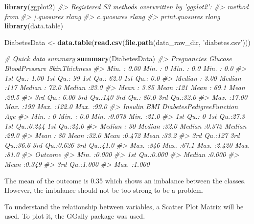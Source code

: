 \documentclass[]{book}
\newenvironment{Shaded}{\begin{snugshade}}{\end{snugshade}}
\newcommand{\CommentTok}[1]{\textcolor[rgb]{0.56,0.35,0.01}{\textit{#1}}}
\newcommand{\KeywordTok}[1]{\textcolor[rgb]{0.13,0.29,0.53}{\textbf{#1}}}
\newcommand{\NormalTok}[1]{#1}
\newcommand{\StringTok}[1]{\textcolor[rgb]{0.31,0.60,0.02}{#1}}
\begin{document}
\begin{Shaded}
\begin{Highlighting}[]
\KeywordTok{library}\NormalTok{(ggplot2)}
\CommentTok{#> Registered S3 methods overwritten by 'ggplot2':}
\CommentTok{#>   method         from }
\CommentTok{#>   [.quosures     rlang}
\CommentTok{#>   c.quosures     rlang}
\CommentTok{#>   print.quosures rlang}
\KeywordTok{library}\NormalTok{(data.table)}

\NormalTok{DiabetesData <-}\StringTok{ }\KeywordTok{data.table}\NormalTok{(}\KeywordTok{read.csv}\NormalTok{(}\KeywordTok{file.path}\NormalTok{(data_raw_dir, }\StringTok{'diabetes.csv'}\NormalTok{)))}

\CommentTok{# Quick data summary}
\KeywordTok{summary}\NormalTok{(DiabetesData)}
\CommentTok{#>   Pregnancies       Glucose    BloodPressure   SkinThickness }
\CommentTok{#>  Min.   : 0.00   Min.   :  0   Min.   :  0.0   Min.   : 0.0  }
\CommentTok{#>  1st Qu.: 1.00   1st Qu.: 99   1st Qu.: 62.0   1st Qu.: 0.0  }
\CommentTok{#>  Median : 3.00   Median :117   Median : 72.0   Median :23.0  }
\CommentTok{#>  Mean   : 3.85   Mean   :121   Mean   : 69.1   Mean   :20.5  }
\CommentTok{#>  3rd Qu.: 6.00   3rd Qu.:140   3rd Qu.: 80.0   3rd Qu.:32.0  }
\CommentTok{#>  Max.   :17.00   Max.   :199   Max.   :122.0   Max.   :99.0  }
\CommentTok{#>     Insulin         BMI       DiabetesPedigreeFunction      Age      }
\CommentTok{#>  Min.   :  0   Min.   : 0.0   Min.   :0.078            Min.   :21.0  }
\CommentTok{#>  1st Qu.:  0   1st Qu.:27.3   1st Qu.:0.244            1st Qu.:24.0  }
\CommentTok{#>  Median : 30   Median :32.0   Median :0.372            Median :29.0  }
\CommentTok{#>  Mean   : 80   Mean   :32.0   Mean   :0.472            Mean   :33.2  }
\CommentTok{#>  3rd Qu.:127   3rd Qu.:36.6   3rd Qu.:0.626            3rd Qu.:41.0  }
\CommentTok{#>  Max.   :846   Max.   :67.1   Max.   :2.420            Max.   :81.0  }
\CommentTok{#>     Outcome     }
\CommentTok{#>  Min.   :0.000  }
\CommentTok{#>  1st Qu.:0.000  }
\CommentTok{#>  Median :0.000  }
\CommentTok{#>  Mean   :0.349  }
\CommentTok{#>  3rd Qu.:1.000  }
\CommentTok{#>  Max.   :1.000}
\end{Highlighting}
\end{Shaded}

The mean of the outcome is 0.35 which shows an imbalance between the classes. However, the imbalance should not be too strong to be a problem.

To understand the relationship between variables, a Scatter Plot Matrix will be used. To plot it, the GGally package was used.
\end{document}
